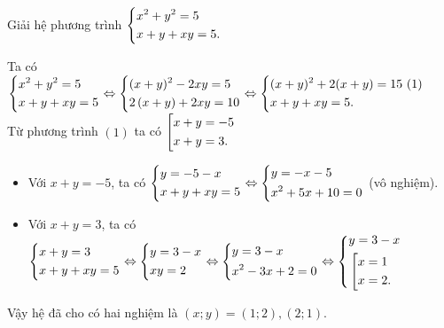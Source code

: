 \begin{ex}%
Giải hệ phương trình $\heva{&x^2+y^2=5\\&x+y+xy=5.}$
	\loigiai
	{ Ta có $\heva{& x^2+y^2=5\\&x+y+xy=5} \Leftrightarrow \heva{&(x+y)^2-2xy=5\\& 2\left(x+y\right)+2xy=10} \Leftrightarrow \heva{& (x+y)^2+2(x+y)=15 \, \,(1)\\& x+y+xy=5.}$\\
		Từ phương trình $(1)$ ta có $\hoac{&x+y=-5\\&x+y=3.}$\\
	\begin{itemize}
		\item Với $x+y=-5$, ta có $\heva{&y=-5-x\\& x+y+xy=5} \Leftrightarrow \heva{&y=-x-5\\& x^2+5x+10=0}$ (vô nghiệm).\\
		\item Với $x+y=3$, ta có $\heva{& x+y=3\\&x+y+xy=5} \Leftrightarrow \heva{& y=3-x\\& xy=2} \Leftrightarrow  \heva{&y=3-x\\&x^2-3x+2 =0} \Leftrightarrow \heva{&y=3-x\\& \hoac{&x=1\\&x=2.}}$\\
	\end{itemize}
	Vậy hệ đã cho có hai nghiệm là $\left(x;y\right)=(1;2),(2;1).$
	}
\end{ex}

